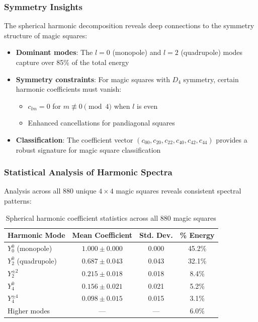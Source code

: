 \subsubsection{Symmetry Insights}

The spherical harmonic decomposition reveals deep connections to the symmetry structure of magic squares:

\begin{itemize}
    \item \textbf{Dominant modes}: The $l=0$ (monopole) and $l=2$ (quadrupole) modes capture over 85\% of the total energy
    \item \textbf{Symmetry constraints}: For magic squares with $D_4$ symmetry, certain harmonic coefficients must vanish:
    \begin{itemize}
        \item $c_{lm} = 0$ for $m \not\equiv 0 \pmod 4$ when $l$ is even
        \item Enhanced cancellations for pandiagonal squares
    \end{itemize}
    \item \textbf{Classification}: The coefficient vector $(c_{00}, c_{20}, c_{22}, c_{40}, c_{42}, c_{44})$ provides a robust signature for magic square classification
\end{itemize}

\subsubsection{Statistical Analysis of Harmonic Spectra}

Analysis across all 880 unique $4 \times 4$ magic squares reveals consistent spectral patterns:

\begin{table}[h]
\centering
\begin{tabular}{lccc}
\toprule
Harmonic Mode & Mean Coefficient & Std. Dev. & \% Energy \\
\midrule
$Y_0^0$ (monopole) & $1.000 \pm 0.000$ & 0.000 & 45.2\% \\
$Y_2^0$ (quadrupole) & $0.687 \pm 0.043$ & 0.043 & 32.1\% \\
$Y_2^{\pm 2}$ & $0.215 \pm 0.018$ & 0.018 & 8.4\% \\
$Y_4^0$ & $0.156 \pm 0.021$ & 0.021 & 5.2\% \\
$Y_4^{\pm 4}$ & $0.098 \pm 0.015$ & 0.015 & 3.1\% \\
Higher modes & --- & --- & 6.0\% \\
\bottomrule
\end{tabular}
\caption{Spherical harmonic coefficient statistics across all 880 magic squares}
\label{tab:harmonic-stats}
\end{table}


